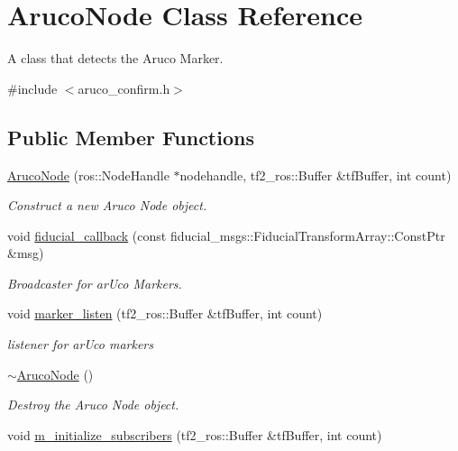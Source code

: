 \hypertarget{class_aruco_node}{}\section{Aruco\+Node Class Reference}
\label{class_aruco_node}


A class that detects the Aruco Marker.  




{\ttfamily \#include $<$aruco\+\_\+confirm.\+h$>$}

\subsection*{Public Member Functions}
\begin{DoxyCompactItemize}
\item 
\hyperlink{class_aruco_node_af8a93117bb0cf5f43bc10d3f0c2e9777}{Aruco\+Node} (ros\+::\+Node\+Handle $\ast$nodehandle, tf2\+\_\+ros\+::\+Buffer \&tf\+Buffer, int count)
\begin{DoxyCompactList}\small\item\em Construct a new Aruco Node object. \end{DoxyCompactList}\item 
void \hyperlink{class_aruco_node_af68c583d73a36c483d28b96a6fd22713}{fiducial\+\_\+callback} (const fiducial\+\_\+msgs\+::\+Fiducial\+Transform\+Array\+::\+Const\+Ptr \&msg)
\begin{DoxyCompactList}\small\item\em Broadcaster for ar\+Uco Markers. \end{DoxyCompactList}\item 
void \hyperlink{class_aruco_node_ad79fd951057c9a40f34fc159363fbd94}{marker\+\_\+listen} (tf2\+\_\+ros\+::\+Buffer \&tf\+Buffer, int count)
\begin{DoxyCompactList}\small\item\em listener for ar\+Uco markers \end{DoxyCompactList}\item 
\hyperlink{class_aruco_node_a134694163a28530a800198e2c039eb25}{$\sim$\+Aruco\+Node} ()
\begin{DoxyCompactList}\small\item\em Destroy the Aruco Node object. \end{DoxyCompactList}\item 
void \hyperlink{class_aruco_node_a986dfcf96c1b6688571e85b181d011e0}{m\+\_\+initialize\+\_\+subscribers} (tf2\+\_\+ros\+::\+Buffer \&tf\+Buffer, int count)
\end{DoxyCompactItemize}
